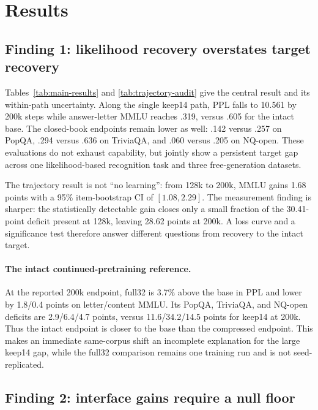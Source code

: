 \section{Results}
\label{sec:experiments}

\subsection{Finding 1: likelihood recovery overstates target recovery}




Tables~\ref{tab:main-results} and \ref{tab:trajectory-audit} give the central
result and its within-path uncertainty.
Along the single keep14 path, PPL falls to 10.561 by 200k steps while
answer-letter MMLU reaches .319, versus .605 for the intact base. The
closed-book endpoints remain lower as well: .142 versus .257 on PopQA, .294
versus .636 on TriviaQA, and .060 versus .205 on NQ-open. These evaluations do
not exhaust capability, but jointly show a persistent target gap across one
likelihood-based recognition task and three free-generation datasets.

The trajectory result is not ``no learning'': from 128k to 200k, MMLU gains
1.68 points with a 95\% item-bootstrap CI of $[1.08,2.29]$. The measurement
finding is sharper: the statistically detectable gain closes only a small
fraction of the 30.41-point deficit present at 128k, leaving 28.62 points at
200k. A loss curve and a significance test therefore answer different
questions from recovery to the intact target.

\paragraph{The intact continued-pretraining reference.}
At the reported 200k endpoint, full32 is 3.7\% above the base in PPL and lower by 1.8/0.4 points on
letter/content MMLU. Its PopQA, TriviaQA, and NQ-open deficits are
2.9/6.4/4.7 points, versus 11.6/34.2/14.5 points for keep14 at 200k. Thus the
intact endpoint is closer to the base than the compressed
endpoint. This makes an immediate same-corpus shift an incomplete explanation
for the large keep14 gap, while the full32 comparison remains one training run and is not seed-replicated.

\subsection{Finding 2: interface gains require a null floor}


